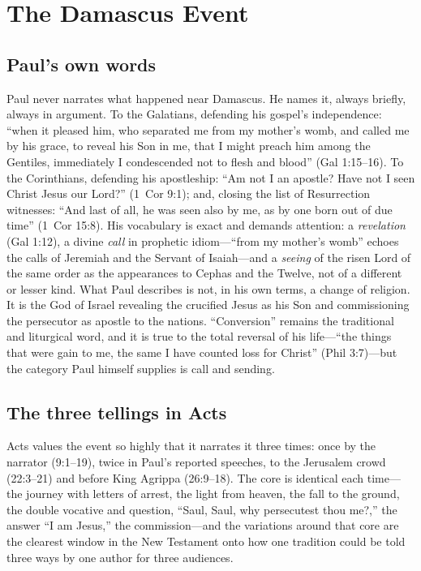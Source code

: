 \section{The Damascus Event}

\subsection{Paul's own words}

Paul never narrates what happened near Damascus. He names it, always
briefly, always in argument. To the Galatians, defending his gospel's
independence: ``when it pleased him, who separated me from my mother's
womb, and called me by his grace, to reveal his Son in me, that I might
preach him among the Gentiles, immediately I condescended not to flesh and
blood'' (Gal 1:15--16). To the Corinthians, defending his apostleship:
``Am not I an apostle? Have not I seen Christ Jesus our Lord?'' (1~Cor
9:1); and, closing the list of Resurrection witnesses: ``And last of all,
he was seen also by me, as by one born out of due time'' (1~Cor 15:8). His
vocabulary is exact and demands attention: a \emph{revelation} (Gal 1:12),
a divine \emph{call} in prophetic idiom---``from my mother's womb'' echoes
the calls of Jeremiah and the Servant of Isaiah---and a \emph{seeing} of
the risen Lord of the same order as the appearances to Cephas and the
Twelve, not of a different or lesser kind. What Paul describes is not, in
his own terms, a change of religion. It is the God of Israel revealing the
crucified Jesus as his Son and commissioning the persecutor as apostle to
the nations. ``Conversion'' remains the traditional and liturgical word,
and it is true to the total reversal of his life---``the things that were
gain to me, the same I have counted loss for Christ'' (Phil 3:7)---but the
category Paul himself supplies is call and sending.

\subsection{The three tellings in Acts}

Acts values the event so highly that it narrates it three times: once by
the narrator (9:1--19), twice in Paul's reported speeches, to the
Jerusalem crowd (22:3--21) and before King Agrippa (26:9--18). The core is
identical each time---the journey with letters of arrest, the light from
heaven, the fall to the ground, the double vocative and question, ``Saul,
Saul, why persecutest thou me?,'' the answer ``I am Jesus,'' the
commission---and the variations around that core are the clearest window
in the New Testament onto how one tradition could be told three ways by
one author for three audiences.

